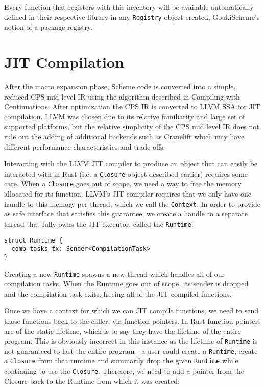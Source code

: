 \documentclass[sigplan,authordraft]{acmart}
\begin{document}
Every function that registers with this inventory will be available automatically
defined in their respective library in any \texttt{Registry} object created,
GoukiScheme's notion of a package registry.

\section{JIT Compilation}

After the macro expansion phase, Scheme code is converted into a simple, reduced
CPS mid level IR using the algorithm described in Compiling with
Continuations\cite{cwc}. After optimization the CPS IR is converted to
LLVM SSA\cite{llvm} for JIT compilation. LLVM was chosen due to its relative
familiarity and large set of supported platforms, but the relative simplicity of
the CPS mid level IR does not rule out the adding of additional backends such
as Cranelift\cite{cranelift} which may have different performance
characteristics and trade-offs.

Interacting with the LLVM JIT compiler to produce an object that can easily be
interacted with in Rust (i.e. a \texttt{Closure} object described earlier)
requires some care. When a \texttt{Closure} goes out of scope, we need a way to
free the memory allocated for its function. LLVM's JIT compiler requires that
we only have one handle to this memory per thread, which we call the
\texttt{Context}\cite{context}. In order to provide as safe interface that
satisfies this guarantee, we create a handle to a separate thread that fully owns
the JIT executor, called the \texttt{Runtime}:

\begin{verbatim}
struct Runtime {
  comp_tasks_tx: Sender<CompilationTask>
}
\end{verbatim}

Creating a new \texttt{Runtime} spawns a new thread which handles all of our
compilation tasks. When the Runtime goes out of scope, its sender is dropped
and the compilation task exits, freeing all of the JIT compiled functions.

Once we have a context for which we can JIT compile functions, we need to send
those functions back to the caller, via function pointers. In Rust function
pointers are of the static lifetime, which is to say they have the lifetime of
the entire program. This is obviously incorrect in this instance as the lifetime
of \texttt{Runtime} is not guaranteed to last the entire program - a user could
create a \texttt{Runtime}, create a \texttt{Closure} from that runtime and
summarily drop the given \texttt{Runtime} while continuing to use the
\texttt{Closure}. Therefore, we need to add a pointer from the Closure back to
the Runtime from which it was created:
\end{document}
